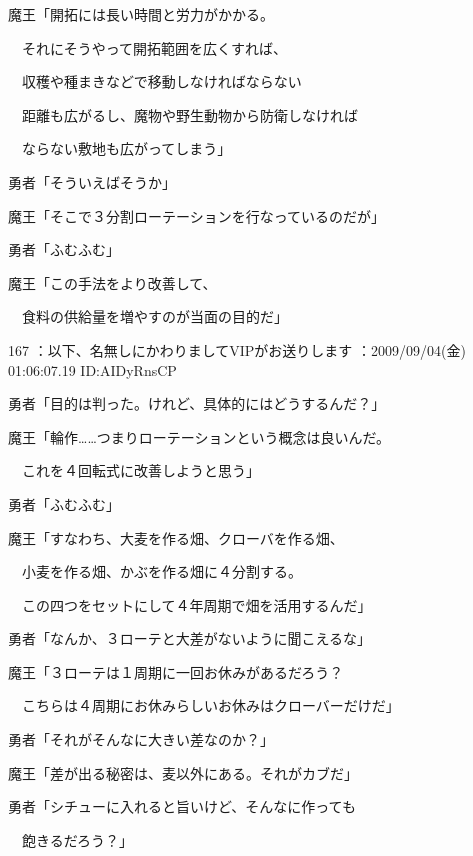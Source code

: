 \documentclass[a4j,twocolumn]{tarticle}
\begin{document}
魔王「開拓には長い時間と労力がかかる。\par{} 
　それにそうやって開拓範囲を広くすれば、\par{} 
　収穫や種まきなどで移動しなければならない\par{} 
　距離も広がるし、魔物や野生動物から防衛しなければ \par{}
　ならない敷地も広がってしまう」 



勇者「そういえばそうか」 



魔王「そこで３分割ローテーションを行なっているのだが」\par{} 
勇者「ふむふむ」 



魔王「この手法をより改善して、\par{} 
　食料の供給量を増やすのが当面の目的だ」 

	
    
    

167 ：以下、名無しにかわりましてVIPがお送りします ：2009/09/04(金) 01:06:07.19 ID:AIDyRnsCP


勇者「目的は判った。けれど、具体的にはどうするんだ？」 



魔王「輪作……つまりローテーションという概念は良いんだ。\par{} 
　これを４回転式に改善しようと思う」 



勇者「ふむふむ」 



魔王「すなわち、大麦を作る畑、クローバを作る畑、\par{} 
　小麦を作る畑、かぶを作る畑に４分割する。\par{} 
　この四つをセットにして４年周期で畑を活用するんだ」 



勇者「なんか、３ローテと大差がないように聞こえるな」 



魔王「３ローテは１周期に一回お休みがあるだろう？\par{} 
　こちらは４周期にお休みらしいお休みはクローバーだけだ」 



勇者「それがそんなに大きい差なのか？」



魔王「差が出る秘密は、麦以外にある。それがカブだ」 



勇者「シチューに入れると旨いけど、そんなに作っても\par{} 
　飽きるだろう？」 
\end{document}
